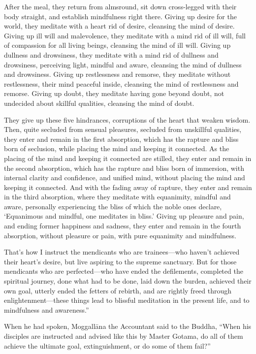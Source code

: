 \documentclass[12pt,openany]{book}%
\begin{document}
After the meal, they return from almsround, sit down cross-legged with their body straight, and establish mindfulness right there. Giving up desire for the world, they meditate with a heart rid of desire, cleansing the mind of desire. Giving up ill will and malevolence, they meditate with a mind rid of ill will, full of compassion for all living beings, cleansing the mind of ill will. Giving up dullness and drowsiness, they meditate with a mind rid of dullness and drowsiness, perceiving light, mindful and aware, cleansing the mind of dullness and drowsiness. Giving up restlessness and remorse, they meditate without restlessness, their mind peaceful inside, cleansing the mind of restlessness and remorse. Giving up doubt, they meditate having gone beyond doubt, not undecided about skillful qualities, cleansing the mind of doubt. 

They give up these five hindrances, corruptions of the heart that weaken wisdom. Then, quite secluded from sensual pleasures, secluded from unskillful qualities, they enter and remain in the first absorption, which has the rapture and bliss born of seclusion, while placing the mind and keeping it connected. As the placing of the mind and keeping it connected are stilled, they enter and remain in the second absorption, which has the rapture and bliss born of immersion, with internal clarity and confidence, and unified mind, without placing the mind and keeping it connected. And with the fading away of rapture, they enter and remain in the third absorption, where they meditate with equanimity, mindful and aware, personally experiencing the bliss of which the noble ones declare, ‘Equanimous and mindful, one meditates in bliss.’ Giving up pleasure and pain, and ending former happiness and sadness, they enter and remain in the fourth absorption, without pleasure or pain, with pure equanimity and mindfulness. 

That’s how I instruct the mendicants who are trainees—who haven’t achieved their heart’s desire, but live aspiring to the supreme sanctuary. But for those mendicants who are perfected—who have ended the defilements, completed the spiritual journey, done what had to be done, laid down the burden, achieved their own goal, utterly ended the fetters of rebirth, and are rightly freed through enlightenment—these things lead to blissful meditation in the present life, and to mindfulness and awareness.” 

When he had spoken, \textsanskrit{Moggallāna} the Accountant said to the Buddha, “When his disciples are instructed and advised like this by Master Gotama, do all of them achieve the ultimate goal, extinguishment, or do some of them fail?” 
\end{document}
